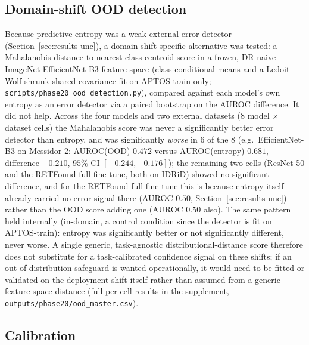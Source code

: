 \documentclass[journal]{IEEEtran}
\begin{document}
\subsection{Domain-shift OOD detection}
\label{sec:results-ood}

Because predictive entropy was a weak external error detector
(Section~\ref{sec:results-unc}), a domain-shift-specific alternative was tested:
a Mahalanobis distance-to-nearest-class-centroid score in a frozen, DR-naive
ImageNet EfficientNet-B3 feature space (class-conditional means and a
Ledoit--Wolf-shrunk shared covariance fit on APTOS-train only;
\texttt{scripts/phase20\_ood\_detection.py}), compared against each model's
own entropy as an error detector via a paired bootstrap on the AUROC
difference. It did not help. Across the four models and two external datasets ($8$
model $\times$ dataset cells) the Mahalanobis score was never a significantly
better error detector than entropy, and was significantly \emph{worse} in
$6$ of the $8$ (e.g.\ EfficientNet-B3 on Messidor-2: AUROC(OOD) $0.472$ versus
AUROC(entropy) $0.681$, difference $-0.210$, $95\%$ CI $[-0.244,-0.176]$); the
remaining two cells (ResNet-50 and the RETFound full fine-tune, both on IDRiD)
showed no significant difference, and for the RETFound full fine-tune this is
because entropy itself already carried no error signal there (AUROC $0.50$,
Section~\ref{sec:results-unc}) rather than the OOD score adding one (AUROC
$0.50$ also). The same pattern held internally (in-domain, a control condition
since the detector is fit on APTOS-train): entropy was significantly better
or not significantly different, never worse. A single
generic, task-agnostic distributional-distance score therefore does not
substitute for a task-calibrated confidence signal on these shifts; if an
out-of-distribution safeguard is wanted operationally, it would need to be
fitted or validated on the deployment shift itself rather than assumed from a
generic feature-space distance (full per-cell results in the supplement,
\texttt{outputs/phase20/ood\_master.csv}).

\subsection{Calibration}
\label{sec:results-calib}
\end{document}
